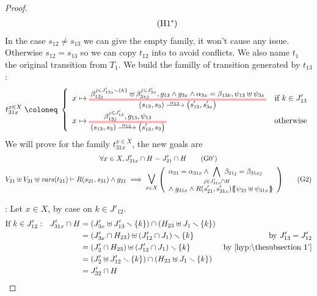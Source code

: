 \documentclass{article}
\begin{document}
\begin{proof}
\begin{gather*}
{\begin{array}{l}
		\end{array}} \hyp{1"}
	\end{gather*}
	In the case \(s_{12} \neq s_{13}\) we can give the empty family, it won't cause any issue.
	Otherwise \(s_{12} = s_{13}\) so we can copy \(t_{12}\) into  to avoid conflicts.
	We also name \(t_1\) the original transition from \(T_1\).
	We build the familly of transition generated by \(t_{13}\):
	\[ t_{31x}^{x \in X} \defobject \choice{
		x \mapsto \OT{\mpar{s_{13}, s_3}}{\mpar{s'_{13}, s'_{3x}}}{\alpha_{13}}{\beta_{13j}^{j \in J'_{13x} \setminus \mbrc{k}} \uplus \beta_{3xj}^{j \in J'_{3x}}}{g_{13} \wedge g_{3x} \wedge \alpha_{3x} = \beta_{13k}}{\psi_{13} \uplus \psi_{3x}} & \text{if } k \in J'_{13} \\
		x \mapsto \OT{\mpar{s_{13}, s_3}}{\mpar{s'_{13}, s_3}}{\alpha_{13}}{\beta_{13j}^{j \in J'_{13}}}{g_{13}}{\psi_{13}} & \text{otherwise}
	} \]
	We will prove  for the family \(t_{31x}^{x \in X}\), the new goals are
	\begin{gather}
		\forall x \in X, J'_{31x} \cap H = J'_{21} \cap H \goal{0'} \\
		V_{21} \uplus V_{31} \uplus \fvars{t_{21}} \vdash R\mpar{s_{21}, s_{31}} \wedge g_{21} \implies \operatorname*{\bigsymb{\bigvee}}_{x \in X} \mpar{\everymath{\displaystyle}\begin{array}{l}
			\alpha_{21} = \alpha_{31x} \wedge \bigwedge_\subbox{j \in J'_{31x} \cap H} \beta_{21j} = \beta_{31xj} \\[12pt]
			\nwedge g_{31x} \wedge R\mpar{s'_{21}, s'_{31x}}\psubst{\psi_{21} \uplus \psi_{31x}}
		\end{array}} \goal{2}
	\end{gather}
\item[\goal{0'}:] Let \(x \in X\), by case on \(k \in J'_{12}\).
	\begin{align*}
		\text{If } k \in J'_{12}: && J'_{31x} \cap H & = \mpar{J'_{3x} \uplus J'_{13} \setminus \mbrc{k}} \cap \mpar{H_{23} \uplus J_1 \setminus \mbrc{k}} \\
		&&& = \mpar{J'_{3x} \cap H_{23}} \uplus \mpar{J'_{12} \cap J_1} \setminus \mbrc{k} & \text{by } J'_{13} = J'_{12} \\
		&&& = \mpar{J'_2 \cap H_{23}} \uplus \mpar{J'_{12} \cap J_1} \setminus \mbrc{k} & \text{by \hyp{1'}} \\
		&&& = \mpar{J'_2 \uplus J'_{12} \setminus \mbrc{k}} \cap \mpar{H_{23} \uplus J_1 \setminus \mbrc{k}} \\
		&&& = J'_{32} \cap H \\

\end{align*}
\end{proof}
\end{document}
